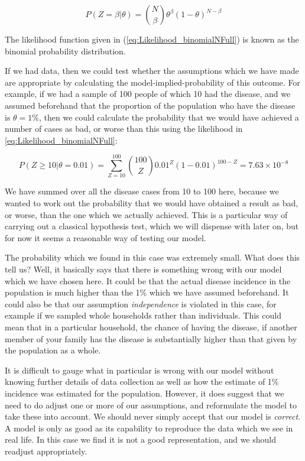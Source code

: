 \documentclass[11pt,fullpage]{book}
\begin{document}
\begin{equation}\label{eq:Likelihood_binomialNFull}
P(Z=\beta|\theta) = {N \choose \beta} \theta^\beta (1-\theta)^{N-\beta}
\end{equation}

The likelihood function given in (\ref{eq:Likelihood_binomialNFull}) is known as the binomial probability distribution.

If we had data, then we could test whether the assumptions which we have made are appropriate by calculating the model-implied-probability of this outcome. For example, if we had a sample of 100 people of which 10 had the disease, and we assumed beforehand that the proportion of the population who have the disease is $\theta=1\%$, then we could calculate the probability that we would have achieved a number of cases as bad, or worse than this using the likelihood in \ref{eq:Likelihood_binomialNFull}:

\begin{equation}
P(Z\geq 10|\theta=0.01) = \sum\limits_{Z=10}^{100}{100 \choose Z} 0.01^Z (1-0.01)^{100-Z} = 7.63 \times 10^{-8}
\end{equation}\label{eq:Likelihood_binomialTest}

We have summed over all the disease cases from 10 to 100 here, because we wanted to work out the probability that we would have obtained a result as bad, or worse, than the one which we actually achieved. This is a particular way of carrying out a classical hypothesis test, which we will dispense with later on, but for now it seems a reasonable way of testing our model. 

The probability which we found in this case was extremely small. What does this tell us? Well, it basically says that there is something wrong with our model which we have chosen here. It could be that the actual disease incidence in the population is much higher than the 1\% which we have assumed beforehand. It could also be that our assumption \textit{independence} is violated in this case, for example if we sampled whole households rather than individuals. This could mean that in a particular household, the chance of having the disease, if another member of your family has the disease is substantially higher than that given by the population as a whole. 

It is difficult to gauge what in particular is wrong with our model without knowing further details of data collection as well as how the estimate of 1\% incidence was estimated for the population. However, it does suggest that we need to do adjust one or more of our assumptions, and reformulate the model to take these into account. We should never simply accept that our model is \textit{correct}. A model is only as good as its capability to reproduce the data which we see in real life. In this case we find it is not a good representation, and we should readjust appropriately.
\end{document}
